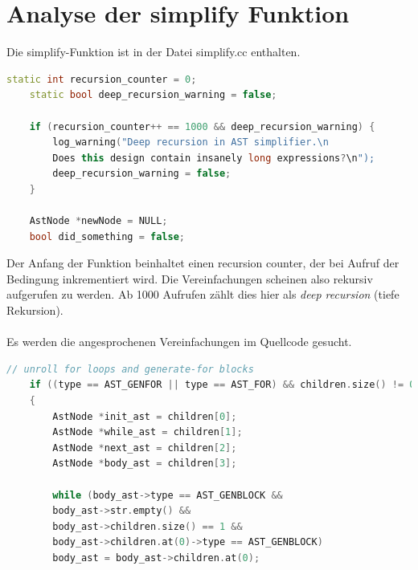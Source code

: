 \documentclass[11pt]{report}
\begin{document}
\section{Analyse der simplify Funktion}

Die simplify-Funktion ist in der Datei simplify.cc enthalten.

\begin{lstlisting}[language=C++]
		static int recursion_counter = 0;
	static bool deep_recursion_warning = false;

	if (recursion_counter++ == 1000 && deep_recursion_warning) {
		log_warning("Deep recursion in AST simplifier.\n
		Does this design contain insanely long expressions?\n");
		deep_recursion_warning = false;
	}

	AstNode *newNode = NULL;
	bool did_something = false;
\end{lstlisting}

Der Anfang der Funktion beinhaltet einen recursion counter, der bei Aufruf der Bedingung inkrementiert wird. Die Vereinfachungen scheinen also rekursiv aufgerufen zu werden. Ab 1000 Aufrufen zählt dies hier als \textit{deep recursion} (tiefe Rekursion).
\\
\\
Es werden die angesprochenen Vereinfachungen im Quellcode gesucht.

\begin{lstlisting}[language=C++]
// unroll for loops and generate-for blocks
	if ((type == AST_GENFOR || type == AST_FOR) && children.size() != 0)
	{
		AstNode *init_ast = children[0];
		AstNode *while_ast = children[1];
		AstNode *next_ast = children[2];
		AstNode *body_ast = children[3];

		while (body_ast->type == AST_GENBLOCK && 
		body_ast->str.empty() &&
		body_ast->children.size() == 1 && 
		body_ast->children.at(0)->type == AST_GENBLOCK)
		body_ast = body_ast->children.at(0);
\end{lstlisting}
\end{document}
